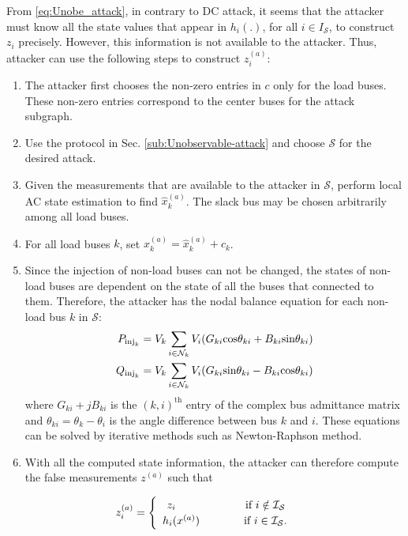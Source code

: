 \documentclass[twocolumn,english,final,journal]{IEEEtran}
\theoremstyle{plain}
\theoremstyle{definition}
\begin{document}
From \eqref{eq:Unobe_attack}, in contrary to DC attack, it seems
that the attacker must know all the state values that appear in $h_{i}(.)$,
for all $i\in I_{\mathcal{S}}$, to construct $z_{i}$ precisely.
However, this information is not available to the attacker. Thus,
attacker can use the following steps to construct $z_{i}^{(a)}$:
\begin{enumerate}
\item The attacker first chooses the non-zero entries in $c$ only for the
load buses. These non-zero entries correspond to the center buses
for the attack subgraph.
\item Use the protocol in Sec. \ref{sub:Unobservable-attack} and choose
$\mathcal{S}$ for the desired attack.
\item Given the measurements that are available to the attacker in $\mathcal{S}$,
perform local AC state estimation to find $\hat{x}_{k}^{(a)}$. The
slack bus may be chosen arbitrarily among all load buses.
\item For all load buses $k$, set $x_{k}^{(a)}=\hat{x}_{k}^{(a)}+c_{k}$.
\item Since the injection of non-load buses can not be changed, the states
of non-load buses are dependent on the state of all the buses that
connected to them. Therefore, the attacker has the nodal balance equation
for each non-load bus $k$ in $\mathcal{S}$: 
\begin{align}
P_{\textrm{inj}_{k}}=V_{k}\sum_{i\in\mathcal{N_{\mathnormal{k}}}}V_{i}(G_{ki}\mbox{cos}\theta_{ki}+B_{ki}\mbox{sin}\theta_{ki})\\
Q_{\textrm{inj}_{k}}=V_{k}\sum_{i\in\mathcal{N_{\mathnormal{k}}}}V_{i}(G_{ki}\mbox{sin}\theta_{ki}-B_{ki}\mbox{cos}\theta_{ki})
\end{align}
where $G_{ki}+jB_{ki}$ is the $(k,i)^{\textrm{th}}$ entry of the
complex bus admittance matrix and $\theta_{ki}=\theta_{k}-\theta_{i}$
is the angle difference between bus $k$ and $i$. These equations
can be solved by iterative methods such as Newton-Raphson method.

\item With all the computed state information, the attacker can therefore
compute the false measurements $z^{(a)}$ such that
\end{enumerate}
\begin{equation}
z_{i}^{(a)}=\begin{cases}
\begin{array}{c}
z_{i}\qquad\;\quad\:\;\\
h_{i}(x^{(a)})\quad\quad
\end{array} & \begin{array}{c}
\mathrm{\mbox{if }}i\notin\mathcal{I}_{\mathcal{S}}\\
\mbox{\ensuremath{\mathrm{\mbox{if }}}}i\in\mathcal{I}_{\mathcal{S}}.
\end{array}\end{cases}\label{eq:AC_attack}
\end{equation}
\end{document}
